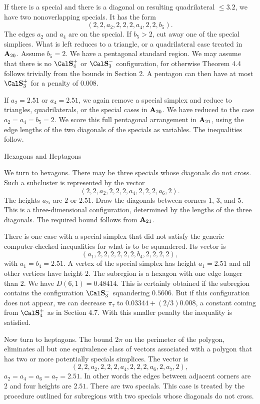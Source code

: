 If there is a special and there is a diagonal on
resulting quadrilateral $\le3.2$, we have two nonoverlapping
specials.  It has the form
$$(2,2,a_2,2,2,2,a_4,2,2,b_5).$$
The edges $a_2$ and $a_4$ are on the special.  If $b_5>2$,
cut away one of the special simplices.  What is left reduces
to a triangle, or a quadrilateral case treated in ${\bold A}_{20}$.
Assume $b_5=2$.  We have a pentagonal standard region.
We may assume that there is no $\Sfour$ or $\Sminus$ configuration,
for otherwise Theorem 4.4 follows trivially from
the bounds in Section 2.  
  A pentagon can then have at most
$\Splus$ for a penalty of $0.008$.

If $a_2=2.51$ or $a_4=2.51$, we
again remove a special simplex and reduce to triangles, quadrilaterals,
or the special cases in ${\bold A}_{20}$.
We have reduced to the case $a_2=a_4=b_5=2$.
We score this full pentagonal arrangement in ${\bold A}_{21}$, using
the edge lengths of the two diagonals of the specials as variables.
The inequalities follow.


 Hexagons and Heptagons \endsubhead

We turn to hexagons.
There may be three specials whose diagonals do not cross.  Such
a subcluster is represented by the vector
$$(2,2,a_2,2,2,2,a_4,2,2,2,a_6,2).$$
The heights $a_{2i}$ are $2$ or $2.51$.  Draw the diagonals between
corners $1$, $3$, and $5$.  This is a three-dimensional configuration,
determined by the lengths of the three diagonals.  The required
bound follows from ${\bold A}_{21}$.

There is one case with a special simplex that 
did not satisfy the generic computer-checked inequalities for
what is to be squandered.  Its vector is
	$$(a_1,2,2,2,2,2,2,b_4,2,2,2,2),$$
with $a_1=b_4=2.51$.
A vertex of the special simplex has height $a_1=2.51$ and
all other vertices have height $2$.  The subregion is a hexagon
with one edge longer than $2$.  We have $D(6,1)= 0.48414$.
This is certainly obtained if the subregion contains the configuration
$\Sminus$ squandering $0.5606$.   
But if this configuration does
not appear, we can decrease $\pi_\tau$ to
	$0.03344 + (2/3) 0.008$, a constant coming from $\Sfour$
as in Section 4.7.  With this smaller penalty the
inequality is satisfied.

Now turn to heptagons.
The bound $2\pi$  on the perimeter of the polygon, eliminates
all but one equivalence class of vectors associated with a polygon
that has two or more potentially specials simplices. The vector is
	$$(2,2,a_2,2,2,2,a_4,2,2,2,a_6,2,a_7,2),$$
$a_2=a_4=a_6=a_7=2.51$.
In other words the edges between adjacent corners are $2$ and
four heights are $2.51$. There are two specials.
  This case is treated by the procedure outlined for
subregions with two specials whose diagonals do not cross.




